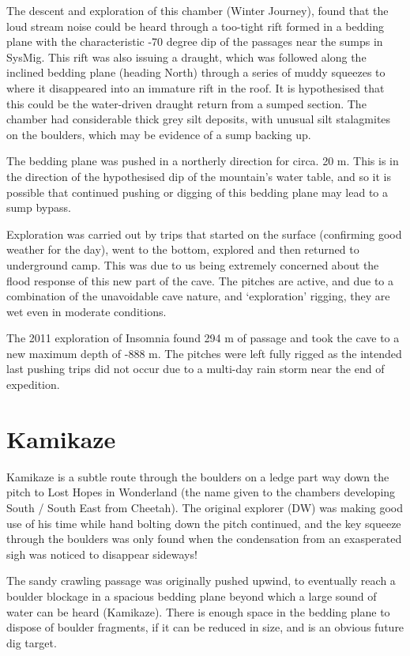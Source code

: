 The descent and exploration of this chamber (Winter Journey), found that
the loud stream noise could be heard through a too-tight rift formed in
a bedding plane with the characteristic -70 degree dip of the passages
near the sumps in SysMig. This rift was also issuing a draught, which
was followed along the inclined bedding plane (heading North) through a
series of muddy squeezes to where it disappeared into an immature rift
in the roof. It is hypothesised that this could be the water-driven
draught return from a sumped section. The chamber had considerable thick
grey silt deposits, with unusual silt stalagmites on the boulders, which
may be evidence of a sump backing up.

The bedding plane was pushed in a northerly direction for circa. 20 m.
This is in the direction of the hypothesised dip of the mountain's water
table, and so it is possible that continued pushing or digging of this
bedding plane may lead to a sump bypass.

Exploration was carried out by trips that started on the surface
(confirming good weather for the day), went to the bottom, explored and
then returned to underground camp. This was due to us being extremely
concerned about the flood response of this new part of the cave. The
pitches are active, and due to a combination of the unavoidable cave
nature, and `exploration' rigging, they are wet even in moderate
conditions.

The 2011 exploration of Insomnia found 294 m of passage and took the
cave to a new maximum depth of -888 m. The pitches were left fully
rigged as the intended last pushing trips did not occur due to a
multi-day rain storm near the end of expedition.

\hypertarget{kamikaze}{%
\section{Kamikaze}\label{kamikaze}}

Kamikaze is a subtle route through the boulders on a ledge part way down
the pitch to Lost Hopes in Wonderland (the name given to the chambers
developing South / South East from Cheetah). The original explorer (DW)
was making good use of his time while hand bolting down the pitch
continued, and the key squeeze through the boulders was only found when
the condensation from an exasperated sigh was noticed to disappear
sideways!

The sandy crawling passage was originally pushed upwind, to eventually
reach a boulder blockage in a spacious bedding plane beyond which a
large sound of water can be heard (Kamikaze). There is enough space in
the bedding plane to dispose of boulder fragments, if it can be reduced
in size, and is an obvious future dig target.

